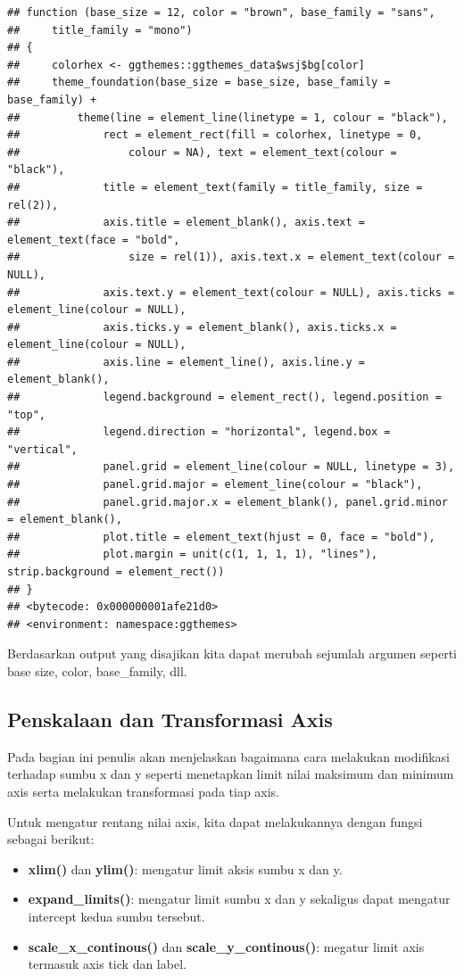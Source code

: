 \documentclass[]{book}
\providecommand{\tightlist}{%
  \setlength{\itemsep}{0pt}\setlength{\parskip}{0pt}}
\begin{document}
\begin{verbatim}
## function (base_size = 12, color = "brown", base_family = "sans", 
##     title_family = "mono") 
## {
##     colorhex <- ggthemes::ggthemes_data$wsj$bg[color]
##     theme_foundation(base_size = base_size, base_family = base_family) + 
##         theme(line = element_line(linetype = 1, colour = "black"), 
##             rect = element_rect(fill = colorhex, linetype = 0, 
##                 colour = NA), text = element_text(colour = "black"), 
##             title = element_text(family = title_family, size = rel(2)), 
##             axis.title = element_blank(), axis.text = element_text(face = "bold", 
##                 size = rel(1)), axis.text.x = element_text(colour = NULL), 
##             axis.text.y = element_text(colour = NULL), axis.ticks = element_line(colour = NULL), 
##             axis.ticks.y = element_blank(), axis.ticks.x = element_line(colour = NULL), 
##             axis.line = element_line(), axis.line.y = element_blank(), 
##             legend.background = element_rect(), legend.position = "top", 
##             legend.direction = "horizontal", legend.box = "vertical", 
##             panel.grid = element_line(colour = NULL, linetype = 3), 
##             panel.grid.major = element_line(colour = "black"), 
##             panel.grid.major.x = element_blank(), panel.grid.minor = element_blank(), 
##             plot.title = element_text(hjust = 0, face = "bold"), 
##             plot.margin = unit(c(1, 1, 1, 1), "lines"), strip.background = element_rect())
## }
## <bytecode: 0x000000001afe21d0>
## <environment: namespace:ggthemes>
\end{verbatim}

Berdasarkan output yang disajikan kita dapat merubah sejumlah argumen
seperti base size, color, base\_family, dll.

\subsection{Penskalaan dan Transformasi
Axis}\label{penskalaan-dan-transformasi-axis}

Pada bagian ini penulis akan menjelaskan bagaimana cara melakukan
modifikasi terhadap sumbu x dan y seperti menetapkan limit nilai
maksimum dan minimum axis serta melakukan transformasi pada tiap axis.

Untuk mengatur rentang nilai axis, kita dapat melakukannya dengan fungsi
sebagai berikut:

\begin{itemize}
\tightlist
\item
  \textbf{xlim()} dan \textbf{ylim()}: mengatur limit aksis sumbu x dan
  y.
\item
  \textbf{expand\_limits()}: mengatur limit sumbu x dan y sekaligus
  dapat mengatur intercept kedua sumbu tersebut.
\item
  \textbf{scale\_x\_continous()} dan \textbf{scale\_y\_continous()}:
  megatur limit axis termasuk axis tick dan label.
\end{itemize}
\end{document}
